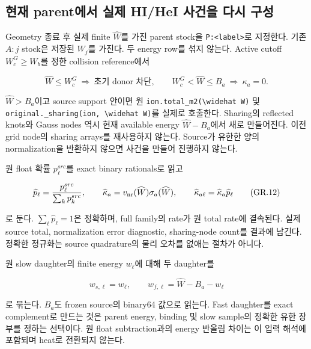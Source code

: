 \hypertarget{uxd604uxc7ac-parentuxc5d0uxc11c-uxc2e4uxc81c-hihei-uxc0acuxac74uxc744-uxb2e4uxc2dc-uxad6cuxc131}{%
\subsection{현재 parent에서 실제 HI/HeI 사건을 다시 구성}\label{uxd604uxc7ac-parentuxc5d0uxc11c-uxc2e4uxc81c-hihei-uxc0acuxac74uxc744-uxb2e4uxc2dc-uxad6cuxc131}}

Geometry 종료 후 실제 finite \(\widehat W\)를 가진 parent stock을 \texttt{P:\textless{}label\textgreater{}}로 지정한다. 기존 \(A:j\) stock은 저장된 \(W_j\)를 가진다. 두 energy row를 섞지 않는다. Active cutoff \(W_c^G\ge W_b\)를 정한 collision reference에서

\[
 \widehat W\le W_c^G\ \Longrightarrow\ \text{초기 donor 차단},
 \qquad
 W_c^G<\widehat W\le B_a\ \Longrightarrow\ \kappa_a=0.
\tag{GR.11}
\]

\(\widehat W>B_a\)이고 source support 안이면 원 \texttt{ion.total\_m2(\textbackslash{}widehat\ W)} 및 \nolinkurl{original._sharing(ion, \widehat W)}를 실제로 호출한다. Sharing의 reflected knots와 Gauss nodes 역시 현재 available energy \(\widehat W-B_a\)에서 새로 만들어진다. 이전 grid node의 sharing arrays를 재사용하지 않는다. Source가 유한한 양의 normalization을 반환하지 않으면 사건을 만들어 진행하지 않는다.

원 float 확률 \(p_\ell^{src}\)를 exact binary rationals로 읽고

\[
 \widehat p_\ell=\frac{p_\ell^{src}}{\sum_kp_k^{src}},\qquad
 \widehat\kappa_a=v_{\rm nr}(\widehat W)\sigma_a(\widehat W),\qquad
 \widehat\kappa_{a\ell}=\widehat\kappa_a\widehat p_\ell
\tag{GR.12}
\]

로 둔다. \(\sum_\ell\widehat p_\ell=1\)은 정확하며, full family의 rate가 원 total rate에 결속된다. 실제 source total, normalization error diagnostic, sharing-node count를 결과에 남긴다. 정확한 정규화는 source quadrature의 물리 오차를 없애는 절차가 아니다.

원 slow daughter의 finite energy \(w_\ell\)에 대해 두 daughter를

\[
 w_{s,\ell}=w_\ell,\qquad
 w_{f,\ell}=\widehat W-B_a-w_\ell
\tag{GR.13}
\]

로 묶는다. \(B_a\)도 frozen source의 binary64 값으로 읽는다. Fast daughter를 exact complement로 만드는 것은 parent energy, binding 및 slow sample의 정확한 유한 장부를 정하는 선택이다. 원 float subtraction과의 energy 반올림 차이는 이 입력 해석에 포함되며 heat로 전환되지 않는다.

